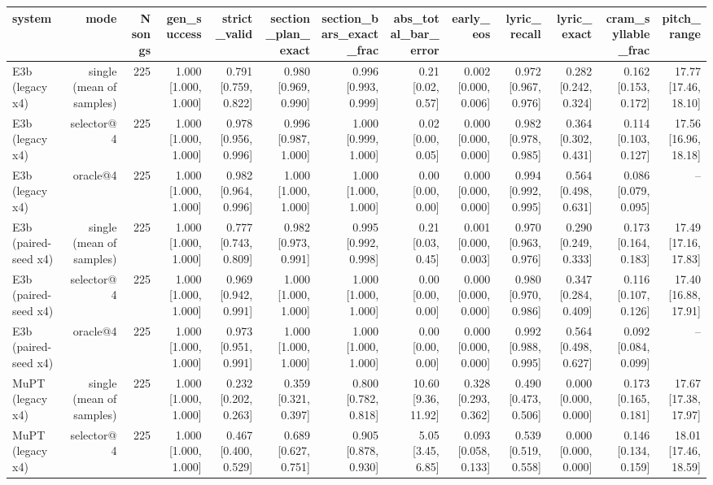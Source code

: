 \begin{table}[t]
\centering
\small
\begin{tabular}{lrrrrrrrrrrrr}
\toprule
system & mode & N songs & gen\_success & strict\_valid & section\_plan\_exact & section\_bars\_exact\_frac & abs\_total\_bar\_error & early\_eos & lyric\_recall & lyric\_exact & cram\_syllable\_frac & pitch\_range \\
\midrule
E3b (legacy x4) & single (mean of samples) & 225 & 1.000 [1.000, 1.000] & 0.791 [0.759, 0.822] & 0.980 [0.969, 0.990] & 0.996 [0.993, 0.999] & 0.21 [0.02, 0.57] & 0.002 [0.000, 0.006] & 0.972 [0.967, 0.976] & 0.282 [0.242, 0.324] & 0.162 [0.153, 0.172] & 17.77 [17.46, 18.10] \\
E3b (legacy x4) & selector@4 & 225 & 1.000 [1.000, 1.000] & 0.978 [0.956, 0.996] & 0.996 [0.987, 1.000] & 1.000 [0.999, 1.000] & 0.02 [0.00, 0.05] & 0.000 [0.000, 0.000] & 0.982 [0.978, 0.985] & 0.364 [0.302, 0.431] & 0.114 [0.103, 0.127] & 17.56 [16.96, 18.18] \\
E3b (legacy x4) & oracle@4 & 225 & 1.000 [1.000, 1.000] & 0.982 [0.964, 0.996] & 1.000 [1.000, 1.000] & 1.000 [1.000, 1.000] & 0.00 [0.00, 0.00] & 0.000 [0.000, 0.000] & 0.994 [0.992, 0.995] & 0.564 [0.498, 0.631] & 0.086 [0.079, 0.095] & – \\
E3b (paired-seed x4) & single (mean of samples) & 225 & 1.000 [1.000, 1.000] & 0.777 [0.743, 0.809] & 0.982 [0.973, 0.991] & 0.995 [0.992, 0.998] & 0.21 [0.03, 0.45] & 0.001 [0.000, 0.003] & 0.970 [0.963, 0.976] & 0.290 [0.249, 0.333] & 0.173 [0.164, 0.183] & 17.49 [17.16, 17.83] \\
E3b (paired-seed x4) & selector@4 & 225 & 1.000 [1.000, 1.000] & 0.969 [0.942, 0.991] & 1.000 [1.000, 1.000] & 1.000 [1.000, 1.000] & 0.00 [0.00, 0.00] & 0.000 [0.000, 0.000] & 0.980 [0.970, 0.986] & 0.347 [0.284, 0.409] & 0.116 [0.107, 0.126] & 17.40 [16.88, 17.91] \\
E3b (paired-seed x4) & oracle@4 & 225 & 1.000 [1.000, 1.000] & 0.973 [0.951, 0.991] & 1.000 [1.000, 1.000] & 1.000 [1.000, 1.000] & 0.00 [0.00, 0.00] & 0.000 [0.000, 0.000] & 0.992 [0.988, 0.995] & 0.564 [0.498, 0.627] & 0.092 [0.084, 0.099] & – \\
MuPT (legacy x4) & single (mean of samples) & 225 & 1.000 [1.000, 1.000] & 0.232 [0.202, 0.263] & 0.359 [0.321, 0.397] & 0.800 [0.782, 0.818] & 10.60 [9.36, 11.92] & 0.328 [0.293, 0.362] & 0.490 [0.473, 0.506] & 0.000 [0.000, 0.000] & 0.173 [0.165, 0.181] & 17.67 [17.38, 17.97] \\
MuPT (legacy x4) & selector@4 & 225 & 1.000 [1.000, 1.000] & 0.467 [0.400, 0.529] & 0.689 [0.627, 0.751] & 0.905 [0.878, 0.930] & 5.05 [3.45, 6.85] & 0.093 [0.058, 0.133] & 0.539 [0.519, 0.558] & 0.000 [0.000, 0.000] & 0.146 [0.134, 0.159] & 18.01 [17.46, 18.59] \\

\end{tabular}
\end{table}
